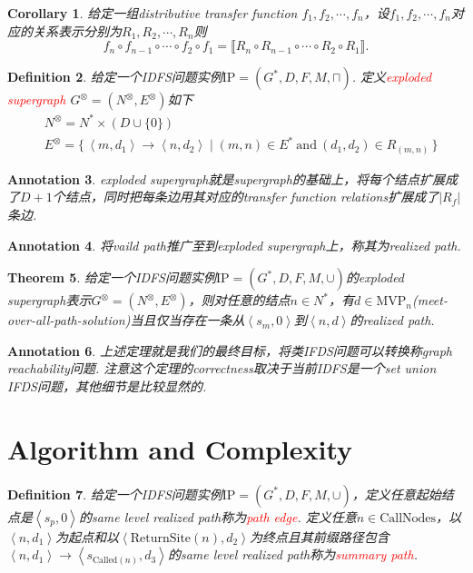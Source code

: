 \documentclass{article}
\newtheorem{theorem}{Theorem}[section]
\newtheorem{corollary}[theorem]{Corollary}
\newtheorem{definition}[theorem]{Definition}
\newtheorem{annotation}[theorem]{Annotation}
\newcommand\Set[2]{\{\,#1\mid#2\,\}} %
\newcommand{\redt}[1]{\textcolor{red}{#1}}
\begin{document}
\begin{corollary}
\rm 给定一组distributive transfer function $f_1,f_2,\cdots,f_n$，设$f_1,f_2,\cdots,f_n$对应的关系表示分别为$R_1,R_2,\cdots,R_n$则
$$
f_n \circ f_{n-1} \circ \cdots \circ f_2 \circ f_1 = \llbracket R_n \circ R_{n-1} \circ \cdots \circ R_2 \circ R_1 \rrbracket.
$$
\end{corollary}

\begin{definition}
\rm 给定一个IDFS问题实例$\text{IP}=(G^*,D,F,M,\sqcap)$. 定义\redt{exploded supergraph} $G^\otimes = (N^\otimes,E^\otimes)$如下
$$
\begin{aligned}
&N^\otimes = N^* \times (D \cup \{0\}) \\
&E^\otimes = \Set{\left<m,d_1\right> \to \left<n,d_2\right>}{(m,n) \in E^*~\text{and}~ (d_1,d_2) \in R_{(m,n)}}
\end{aligned} 
$$
\end{definition}

\begin{annotation}
\rm exploded supergraph就是supergraph的基础上，将每个结点扩展成了$D+1$个结点，同时把每条边用其对应的transfer function relations扩展成了$|R_f|$条边. 
\end{annotation}

\begin{annotation}
\rm 将vaild path推广至到exploded supergraph上，称其为realized path.
\end{annotation}

\begin{theorem}
\rm 给定一个IDFS问题实例$\text{IP}=(G^*,D,F,M,\cup)$的exploded supergraph表示$G^\otimes = (N^\otimes,E^\otimes)$，则对任意的结点$n \in N^*$，有$d \in \text{MVP}_n$(meet-over-all-path-solution)当且仅当存在一条从$\left<s_m, 0\right>$到$\left<n,d\right>$的realized path. 
\end{theorem}

\begin{annotation}
\rm 上述定理就是我们的最终目标，将类IFDS问题可以转换称graph reachability问题. 注意这个定理的correctness取决于当前IDFS是一个set union IFDS问题，其他细节是比较显然的. 
\end{annotation}

\newpage
\section{Algorithm and Complexity}


\begin{definition}
\rm 给定一个IDFS问题实例$\text{IP}=(G^*,D,F,M,\cup)$，定义任意起始结点是$\left<s_p,0\right>$的same level realized path称为\redt{path edge}. 定义任意$n \in \text{CallNodes}$，以$\left<n,d_1\right>$为起点和以$\left<\text{ReturnSite}(n),d_2\right>$为终点且其前缀路径包含$\left<n,d_1\right> \to \left<s_{\text{Called}(n)},d_3\right>$的same level realized path称为\redt{summary path}. 
\end{definition}
\end{document}
